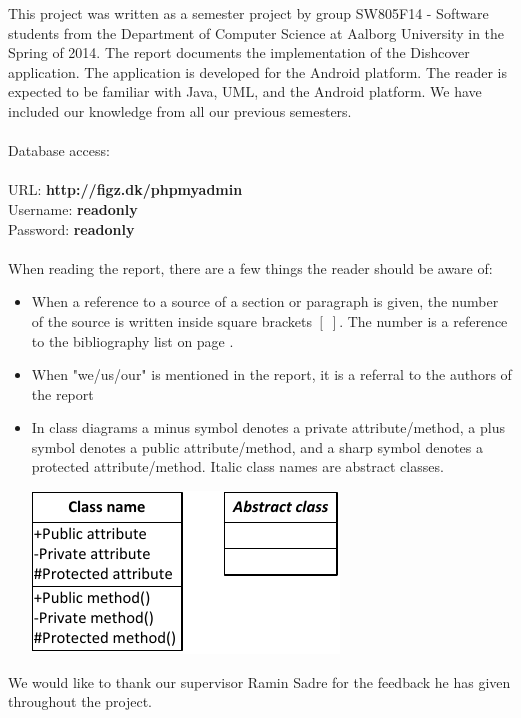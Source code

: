 This project was written as a semester project by group SW805F14 - Software students from the Department of Computer Science at Aalborg University in the Spring of 2014. The report documents the implementation of the Dishcover application. The application is developed for the Android platform. The reader is expected to be familiar with Java, UML, and the Android platform. We have included our knowledge from all our previous semesters.
\\\\
Database access:\\\\
URL: \textbf{http://figz.dk/phpmyadmin}\\
Username: \textbf{readonly}\\
Password: \textbf{readonly}\\\\
When reading the report, there are a few things the reader should be aware of:
\begin{itemize}
\item When a reference to a source of a section or paragraph is given, the number of the source is written inside square brackets $[\;]$. The number is a reference to the bibliography list on page \pageref{chap:bib}.
\item When "we/us/our" is mentioned in the report, it is a referral to the authors of the report
\item In class diagrams a minus symbol denotes a private attribute/method, a plus symbol denotes a public attribute/method, and a sharp symbol denotes a protected attribute/method. Italic class names are abstract classes.
\begin{center}
\includegraphics[width=0.35\linewidth]{img/umltheory.pdf}
\end{center}
\end{itemize}

We would like to thank our supervisor Ramin Sadre for the feedback he has given throughout the project.